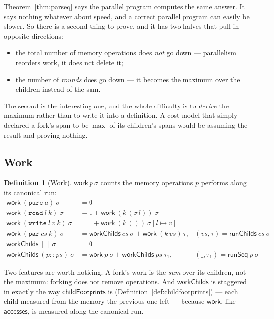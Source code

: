 \documentclass[11pt,a4paper]{article}
\theoremstyle{definition}
\newtheorem{definition}{Definition}
\theoremstyle{plain}
\theoremstyle{remark}
\newcommand{\st}{\sigma}
\newcommand{\acc}{\mathsf{accesses}}
\newcommand{\runSeq}{\mathsf{runSeq}}
\newcommand{\work}{\mathsf{work}}
\newcommand{\upd}[3]{#1[#2 \mapsto #3]}
\begin{document}
Theorem~\ref{thm:parseq} says the parallel program computes the same answer. It says nothing
whatever about speed, and a correct parallel program can easily be slower. So there is a
second thing to prove, and it has two halves that pull in opposite directions:
\begin{itemize}[leftmargin=1.6em,itemsep=1pt]
\item the total number of memory operations does \emph{not} go down --- parallelism reorders
      work, it does not delete it;
\item the number of \emph{rounds} does go down --- it becomes the maximum over the children
      instead of the sum.
\end{itemize}
The second is the interesting one, and the whole difficulty is to \emph{derive} the maximum
rather than to write it into a definition. A cost model that simply declared a fork's span to
be $\max$ of its children's spans would be assuming the result and proving nothing.

\subsection{Work}\label{sec:cost:work}

\begin{definition}[Work]\label{def:work}
$\work\ p\ \st$ counts the memory operations $p$ performs along its canonical run:
\begin{align*}
  \work\ (\texttt{pure}\ a)\ \st &= 0 \\
  \work\ (\texttt{read}\ l\ k)\ \st &= 1 + \work\ (k\,(\st\,l))\ \st \\
  \work\ (\texttt{write}\ l\ v\ k)\ \st &= 1 + \work\ (k\,())\ \upd{\st}{l}{v} \\
  \work\ (\texttt{par}\ cs\ k)\ \st &= \mathsf{workChilds}\ cs\ \st + \work\ (k\,vs)\ \tau,
    & (vs,\tau) = \mathsf{runChilds}\ cs\ \st \\
  \mathsf{workChilds}\ [\,]\ \st &= 0 \\
  \mathsf{workChilds}\ (p :: ps)\ \st &= \work\ p\ \st + \mathsf{workChilds}\ ps\ \tau_1,
    & (\_,\tau_1) = \runSeq\ p\ \st
\end{align*}
\end{definition}

Two features are worth noticing. A fork's work is the \emph{sum} over its children, not the
maximum: forking does not remove operations. And $\mathsf{workChilds}$ is staggered in exactly
the way $\mathsf{childFootprints}$ is (Definition~\ref{def:childfootprints}) --- each child
measured from the memory the previous one left --- because $\work$, like $\acc$, is measured
along the canonical run.
\end{document}
